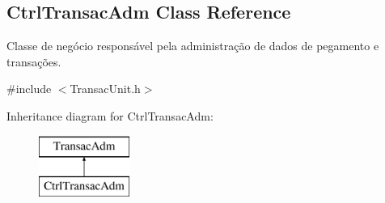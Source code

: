 \hypertarget{classCtrlTransacAdm}{\subsection{Ctrl\-Transac\-Adm Class Reference}
\label{db/d25/classCtrlTransacAdm}
}


Classe de negócio responsável pela administração de dados de pegamento e transações.  




{\ttfamily \#include $<$Transac\-Unit.\-h$>$}

Inheritance diagram for Ctrl\-Transac\-Adm\-:\begin{figure}[H]
\begin{center}
\leavevmode
\includegraphics[height=2.000000cm]{db/d25/classCtrlTransacAdm}
\end{center}
\end{figure}
